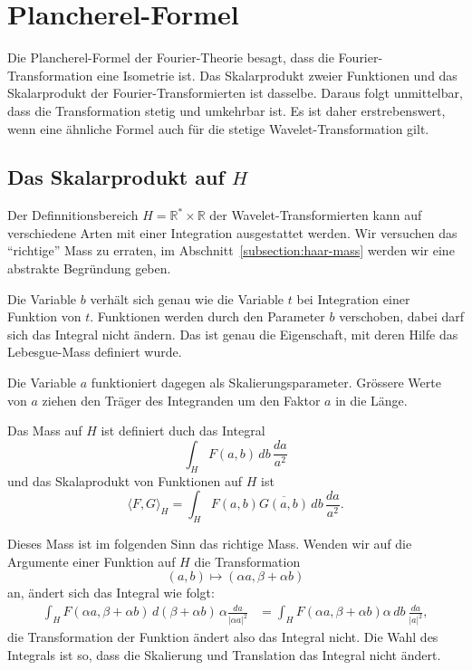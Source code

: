 %
%
%
\section{Plancherel-Formel%
\label{section:cwt:plancherel}}
Die Plancherel-Formel der Fourier-Theorie besagt, dass die
Fourier-Transformation eine Isometrie ist.
Das Skalarprodukt zweier Funktionen und das Skalarprodukt der
Fourier-Transformierten ist dasselbe.
Daraus folgt unmittelbar, dass die Transformation stetig und
umkehrbar ist.
Es ist daher erstrebenswert, wenn eine ähnliche Formel auch
für die stetige Wavelet-Transformation gilt.

\subsection{Das Skalarprodukt auf $H$}
Der Definnitionsbereich $H=\mathbb R^* \times \mathbb R$ der
Wavelet-Transformierten kann auf verschiedene Arten mit einer Integration
ausgestattet werden.
Wir versuchen das ``richtige'' Mass zu erraten, im
Abschnitt~\ref{subsection:haar-mass} werden wir eine abstrakte Begründung
geben.

Die Variable $b$ verhält sich genau wie die Variable $t$ bei Integration
einer Funktion von $t$.
Funktionen werden durch den Parameter $b$ verschoben, dabei darf sich
das Integral nicht ändern.
Das ist genau die Eigenschaft, mit deren Hilfe das Lebesgue-Mass
definiert wurde.

Die Variable $a$ funktioniert dagegen als Skalierungsparameter.
Grössere Werte von $a$ ziehen den Träger des Integranden um den Faktor $a$ 
in die Länge.

\begin{definition}
\label{cwt:definition:plancherel}
Das Mass auf $H$ ist definiert duch das Integral
\[
\int_H F(a,b)\,db \,\frac{da}{a^2}
\]
und das Skalaprodukt von Funktionen auf $H$ ist
\[
\langle F,G\rangle_H
=
\int_{H} F(a,b)\overline{G(a,b)}\,db \,\frac{da}{a^2}.
\]
\end{definition}

Dieses Mass ist im folgenden Sinn das richtige Mass.
Wenden wir auf die Argumente einer Funktion auf $H$ die Transformation
\[
(a,b) \mapsto (\alpha a, \beta + \alpha b)
\]
an, ändert sich das Integral wie folgt:
\begin{align*}
\int_H F(\alpha a,\beta + \alpha b)\,d(\beta + \alpha b)\,\alpha\frac{da}{|\alpha a|^2}
&=
\int_H F(\alpha a,\beta + \alpha b) \alpha\,db \ \frac{da}{|a|^2},
\end{align*}
die Transformation der Funktion ändert also das Integral nicht.
Die Wahl des Integrals ist so, dass die Skalierung und Translation
das Integral nicht ändert.

